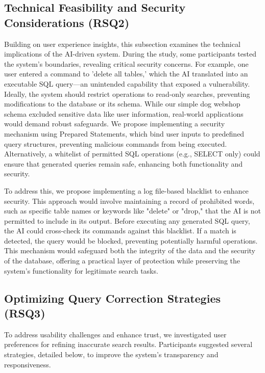 \documentclass[../../submission.tex]{subfiles}
\begin{document}
 \subsection{Technical Feasibility and Security Considerations (RSQ2)}
 Building on user experience insights, this subsection examines the technical implications 
 of the AI-driven system. During the study, some participants tested the system’s boundaries, 
 revealing critical security concerns. For example, one user entered a command to 'delete 
 all tables,' which the AI translated into an executable SQL query—an unintended capability 
 that exposed a vulnerability. Ideally, the system should restrict operations to read-only 
 searches, preventing modifications to the database or its schema. While our simple dog 
 webshop schema excluded sensitive data like user information, real-world applications 
 would demand robust safeguards. We propose implementing a security mechanism using 
 Prepared Statements, which bind user inputs to predefined query structures, preventing 
 malicious commands from being executed. Alternatively, a whitelist of permitted SQL 
 operations (e.g., SELECT only) could ensure that generated queries remain safe, enhancing 
 both functionality and security. 

 To address this, we propose implementing a log file-based blacklist to enhance security. 
 This approach would involve maintaining a record of prohibited words, such as specific 
 table names or keywords like "delete" or "drop," that the AI is not permitted to include 
 in its output. Before executing any generated SQL query, the AI could cross-check its 
 commands against this blacklist. If a match is detected, the query would be blocked, 
 preventing potentially harmful operations. This mechanism would safeguard both the 
 integrity of the data and the security of the database, offering a practical layer 
 of protection while preserving the system’s functionality for legitimate search tasks.
 
 \subsection{Optimizing Query Correction Strategies (RSQ3)}
 To address usability challenges and enhance trust, we investigated user preferences 
 for refining inaccurate search results. Participants suggested several strategies, 
 detailed below, to improve the system’s transparency and responsiveness.
\end{document}
